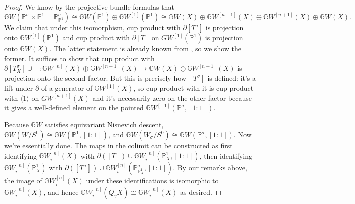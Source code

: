 \documentclass[draftthesis,tocnosub,noragright,centerchapter,10pt]{uiucthesis2009}
\newcommand{\mbb}{\mathbb}
\theoremstyle{plain}
\theoremstyle{definition}
\begin{document}
\begin{proof}
We know by the projective bundle formulas
that 
\[
\mbb GW(\mbb P^\sigma \times \mbb P^1 = \mbb
P^\sigma_{\mbb P^1}) \cong \mbb GW(\mbb P^1) \oplus \mbb GW^{[1]}(\mbb
P^1) \cong \mbb GW(X) \oplus \mbb GW^{[n-1]}(X) \oplus \mbb
GW^{[n+1]}(X) \oplus \mbb GW(X).
\]
We claim that under this isomorphism, cup product with
$\partial [T^\sigma]$ is projection onto $\mbb
GW^{[1]}(\mbb P^1)$ and cup product with $\partial [T]$ on
$GW^{[1]}(\mbb P^1)$ is projection
onto $\mbb GW(X)$. The latter statement is already known from
\cite{Schder}, so we show the former. It suffices to show that cup
product with $\partial [T^\sigma_{X}] \cup - : \mbb GW^{[n]}(X) \oplus
\mbb GW^{[n+1]}(X) \rightarrow \mbb GW(X) \oplus \mbb GW^{[n+1]}(X)$ is projection
onto the second factor. But this is precisely how $[T^\sigma]$ is
defined: it's a lift under $\partial$ of a generator of $\mbb
GW^{[1]}(X)$, so cup product with it is cup product with $\langle 1
\rangle$ on $GW^{[n+1]}(X)$
and it's necessarily zero on the other factor because it gives a
well-defined element on
the pointed $\mbb GW^{[-1]}(\mbb P^\sigma,[1:1])$. 

 
Because $\mbb GW$ satisfies equivariant Nisnevich descent, $\mbb
GW(W/S^0) \cong \mbb GW(\mbb P^1,[1:1])$, and $\mbb GW(W_\sigma/S^0)
\cong \mbb GW(\mbb P^\sigma,[1:1])$. Now we're essentially done. The
maps in the colimit can be constructed as first identifying $\mbb GW_i^{[n]}(X)$
with $\partial([T]) \cup \mbb GW_i^{[n]}(\mbb P^1_X,[1:1])$, then identifying
$\mbb GW_i^{[n]}(\mbb P^1_X)$ with  $\partial([T^\sigma]) \cup
\mbb GW_i^{[n]}(\mbb P^\sigma_{\mbb P^1_X},[1:1])$. By our remarks above,
the image of $\mbb GW_i^{[n]}(X)$ under these identifications is isomorphic
to $\mbb GW_i^{[n]}(X)$, and hence $\mbb GW_i^{[n]}(Q_\gamma X) \cong \mbb
GW_i^{[n]}(X)$ as desired.



\end{proof}
\end{document}
